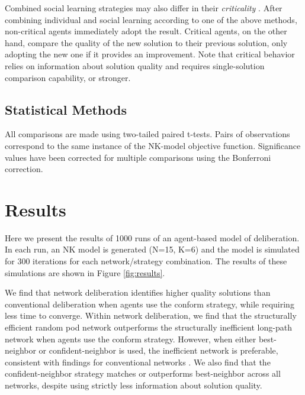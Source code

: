 Combined social learning strategies may also differ in their
{\em criticality} \cite{barkoczi_social_2016, rendell_rogersparadox_2010}.
After combining individual and social learning according to one of the above methods, non-critical agents immediately adopt the result.
Critical agents, on the other hand, compare the quality of the new solution to their previous solution, only adopting the new one if it provides an improvement.
Note that critical behavior relies on information about solution quality and requires single-solution comparison capability, or stronger.


\subsection{Statistical Methods}
All comparisons are made using two-tailed paired t-tests. Pairs of observations correspond to the same instance of the NK-model objective function.
Significance values have been corrected for multiple comparisons using the Bonferroni correction.

\section{Results}

Here we present the results of 1000 runs of an agent-based model of deliberation.
In each run, an NK model is generated (N=15, K=6) and the model is simulated for 300
iterations for each network/strategy combination.
The results of these simulations are shown in Figure \ref{fig:results}.

We find that network deliberation identifies higher quality solutions than
conventional deliberation when agents use the conform strategy,
while requiring less time to converge. Within network deliberation,
we find that the structurally efficient random pod network outperforms the
structurally inefficient long-path network when agents use the conform strategy.
However, when either best-neighbor or confident-neighbor is used,
the inefficient network is preferable, consistent with findings for conventional
networks \cite{barkoczi_social_2016}. We also find that the confident-neighbor
strategy matches or outperforms best-neighbor across all networks,
despite using strictly less information about solution quality.


